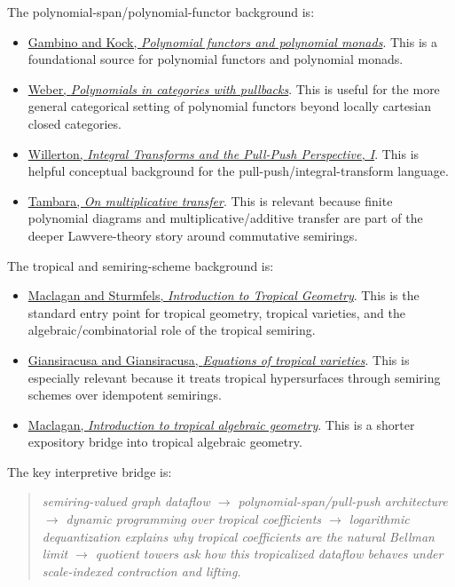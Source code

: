 \documentclass[11pt]{article}
\newenvironment{claimbox}
  {\begin{quote}\itshape}
  {\end{quote}}
\begin{document}
The polynomial-span/polynomial-functor background is:

\begin{itemize}[leftmargin=2em]
\item \href{https://arxiv.org/abs/0906.4931}{Gambino and Kock,
\textit{Polynomial functors and polynomial monads}}. This is a foundational
source for polynomial functors and polynomial monads.
\item \href{https://webercat.au/poly.pdf}{Weber, \textit{Polynomials in
categories with pullbacks}}. This is useful for the more general categorical
setting of polynomial functors beyond locally cartesian closed categories.
\item \href{https://golem.ph.utexas.edu/category/2010/11/integral_transforms_and_pullpu.html}
{Willerton, \textit{Integral Transforms and the Pull-Push Perspective, I}}.
This is helpful conceptual background for the pull-push/integral-transform
language.
\item \href{https://www.tandfonline.com/doi/abs/10.1080/00927879308824627}
{Tambara, \textit{On multiplicative transfer}}. This is relevant because
finite polynomial diagrams and multiplicative/additive transfer are part of the
deeper Lawvere-theory story around commutative semirings.
\end{itemize}

The tropical and semiring-scheme background is:

\begin{itemize}[leftmargin=2em]
\item \href{https://www.ams.org/publications/authors/books/postpub/gsm-161}
{Maclagan and Sturmfels, \textit{Introduction to Tropical Geometry}}. This is
the standard entry point for tropical geometry, tropical varieties, and the
algebraic/combinatorial role of the tropical semiring.
\item \href{https://arxiv.org/abs/1308.0042}{Giansiracusa and Giansiracusa,
\textit{Equations of tropical varieties}}. This is especially relevant because
it treats tropical hypersurfaces through semiring schemes over idempotent
semirings.
\item \href{https://arxiv.org/abs/1207.1925}{Maclagan, \textit{Introduction to
tropical algebraic geometry}}. This is a shorter expository bridge into
tropical algebraic geometry.
\end{itemize}

The key interpretive bridge is:

\begin{claimbox}
semiring-valued graph dataflow
\(\longrightarrow\)
polynomial-span/pull-push architecture
\(\longrightarrow\)
dynamic programming over tropical coefficients
\(\longrightarrow\)
logarithmic dequantization explains why tropical coefficients are the natural
Bellman limit
\(\longrightarrow\)
quotient towers ask how this tropicalized dataflow behaves under scale-indexed
contraction and lifting.
\end{claimbox}
\end{document}
